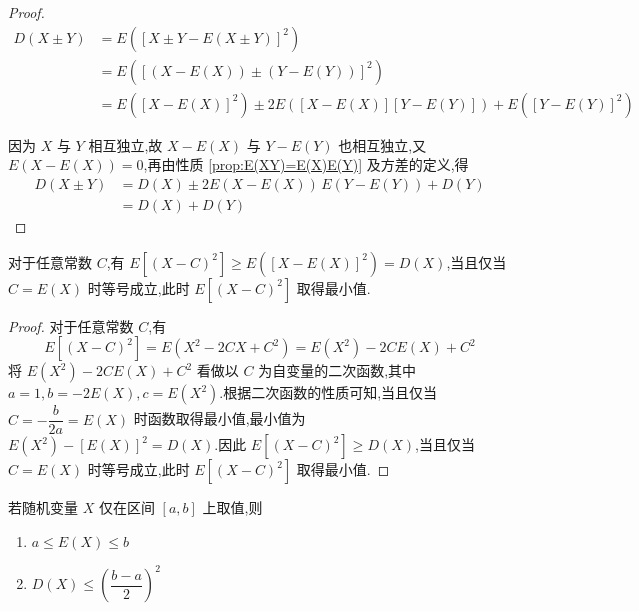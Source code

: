 \begin{proof}
    $$
    \begin{aligned}
        D(X \pm Y) &= E([X \pm Y - E(X \pm Y)]^2) \\
        &= E([(X-E(X)) \pm (Y-E(Y))]^2) \\
        &= E([X-E(X)]^2) \pm 2E([X-E(X)][Y-E(Y)]) + E([Y-E(Y)]^2)
    \end{aligned}
    $$

    因为 $X$ 与 $Y$ 相互独立,故 $X-E(X)$ 与 $Y-E(Y)$ 也相互独立,又 $E(X-E(X)) = 0$,再由性质 \ref{prop:E(XY)=E(X)E(Y)} 及方差的定义,得
    $$
    \begin{aligned}
        D(X \pm Y) &= D(X) \pm 2E(X-E(X)) \, E(Y-E(Y)) + D(Y) \\
        &= D(X) + D(Y)
    \end{aligned}
    $$
\end{proof}

\begin{conclusion}
    \indent 对于任意常数 $C$,有 $E[(X-C)^2] \geqslant E([X-E(X)]^2) = D(X)$,当且仅当 $C=E(X)$ 时等号成立,此时 $E[(X-C)^2]$ 取得最小值.
\end{conclusion}

\begin{proof}
    对于任意常数 $C$,有
    $$
    E[(X-C)^2] = E(X^2 - 2CX + C^2) = E(X^2) - 2CE(X) + C^2
    $$
    将 $E(X^2) - 2CE(X) + C^2$ 看做以 $C$ 为自变量的二次函数,其中 $a=1, b=-2E(X), c=E(X^2)$.根据二次函数的性质可知,当且仅当 $C=-\dfrac{b}{2a}=E(X)$ 时函数取得最小值,最小值为 $E(X^2) - [E(X)]^2 = D(X)$.因此 $E[(X-C)^2] \geqslant D(X)$,当且仅当 $C=E(X)$ 时等号成立,此时 $E[(X-C)^2]$ 取得最小值.
\end{proof}

\begin{conclusion}
    \indent 若随机变量 $X$ 仅在区间 $[a,b]$ 上取值,则
    \begin{enumerate}
        \item $a \leqslant E(X) \leqslant b$
        \item $D(X) \leqslant \left( \dfrac{b-a}{2} \right)^2$
    \end{enumerate}
\end{conclusion}

